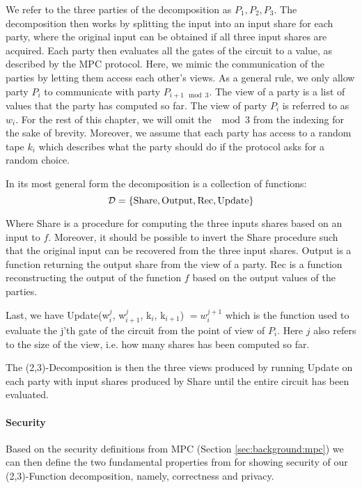 We refer to the three parties of the decomposition as $P_{1}, P_{2}, P_{3}$. The
decomposition then works by splitting the input into an input share for each
party, where the original input can be obtained if all three input shares are
acquired.
Each party then evaluates all the gates of the circuit to a value, as described by
the MPC protocol. Here, we mimic the communication of the parties by letting
them access each other's views. As a general rule, we only allow party $P_{i}$ to
communicate with party $P_{i+1 \mod 3}$.
The view of a party is a list of values that the party has computed so far.
The view of party $P_{i}$ is referred to as $w_{i}$.
For the rest of this chapter, we will omit the $\mod 3$ from the
indexing for the sake of brevity.
Moreover, we assume that each party has access to a random tape $k_{i}$
which describes what the party should do if the protocol asks for a random
choice.

\begin{definition}
  In its most general form the decomposition is a collection of functions:
  \[
    \mathcal{D} = \{\text{Share}, \text{Output}, \text{Rec}, \text{Update}\}
  \]

  Where Share is a procedure for computing the three inputs shares based on an
  input to $f$.
  Moreover, it should be possible to invert the Share procedure such that the
  original input can be recovered from the three input shares.
  Output is a function returning the output share from the view of a party.
  Rec is a function reconstructing the output of the function $f$ based on the
  output values of the parties.

  Last, we have Update(w$^{j}_{i}$, w$^{j}_{i+1}$, k$_{i}$, k$_{i+1}$) $= w^{j+1}_{i}$ which
  is the function used to evaluate the j'th gate of the circuit from the point
  of view of $P_{i}$. Here
  $j$ also refers to the size of the view, i.e. how many shares has been
  computed so far.
\end{definition}

The (2,3)-Decomposition is then the three views produced by running Update on
each party with input shares produced by Share until the entire circuit has been
evaluated.

\paragraph{Security}
Based on the security definitions from MPC (Section \ref{sec:background:mpc}) we
can then define the two fundamental properties from \cite{zkboo} for showing security of
our (2,3)-Function decomposition, namely, correctness and privacy.

